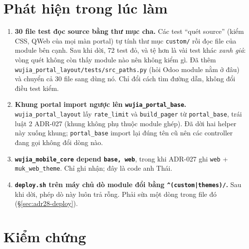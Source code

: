 \section{Phát hiện trong lúc làm}

\begin{enumerate}[nosep]
\item \textbf{30 file test đọc source bằng thư mục cha.} Các test ``quét source'' (kiểm CSS, QWeb của mọi màn portal)
  tự tính thư mục \texttt{custom/} rồi đọc file của module bên cạnh. Sau khi dời, 72 test đỏ, và tệ hơn là vài test
  khác \emph{xanh giả}: vòng quét không còn thấy module nào nên không kiểm gì. Đã thêm
  \texttt{wujia\_portal\_layout/tests/src\_paths.py} (hỏi Odoo module nằm ở đâu) và chuyển cả 30 file sang dùng nó.
  Chỉ đổi cách tìm đường dẫn, không đổi điều test kiểm.
\item \textbf{Khung portal import ngược lên \texttt{wujia\_portal\_base}.} \texttt{wujia\_portal\_layout} lấy
  \texttt{rate\_limit} và \texttt{build\_pager} từ \texttt{portal\_base}, trái luật 2 ADR-027 (khung không phụ thuộc
  module ghép). Đã dời hai helper này xuống khung; \texttt{portal\_base} import lại đúng tên cũ nên các controller
  đang gọi không đổi dòng nào.
\item \textbf{\texttt{wujia\_mobile\_core} depend \texttt{base, web}}, trong khi ADR-027 ghi \texttt{web} +
  \texttt{muk\_web\_theme}. Chỉ ghi nhận; đây là code anh Thái.
\item \textbf{\texttt{deploy.sh} trên máy chủ dò module đổi bằng \texttt{\^{}(custom|themes)/}.} Sau khi dời, phép dò
  này luôn trả rỗng. Phải sửa một dòng trong file đó (\S\ref{sec:adr28-deploy}).
\end{enumerate}

\section{Kiểm chứng}

